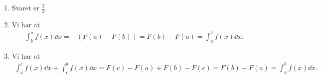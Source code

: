 \begin{enumerate}
	
	\item Svaret er $\frac{2}{3}$.
	
	\item \label{it:bes3} Vi har at 
	\begin{align*}
	-\int_{b}^{a} f(x) \dd x=-(F(a)-F(b))=F(b)-F(a)=\int_{a}^{b} f(x)\dd x.
	\end{align*}
	
	\item \label{it:best2} Vi har at
	\begin{align*}
	\int_a^c f(x)\dd x+\int_c^b f(x)\dd x=F(c)-F(a)+F(b)-F(c)=F(b)-F(a)=\int_{a}^{b} f(x)\dd x.
	\end{align*}
	
	
	
\end{enumerate}